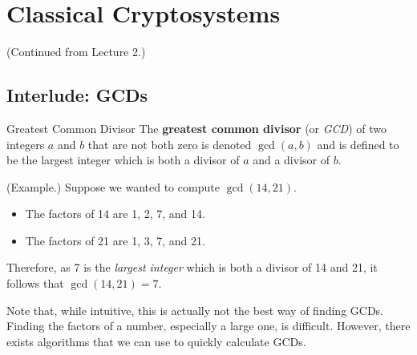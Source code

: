 \documentclass[letterpaper]{article}
\begin{document}
\section{Classical Cryptosystems}
(Continued from Lecture 2.)
\subsection{Interlude: GCDs}
\begin{definition}{Greatest Common Divisor}{}
    The \textbf{greatest common divisor} (or \emph{GCD}) of two integers $a$ and $b$ that are not both zero is denoted $\gcd(a, b)$ and is defined to be the largest integer which is both a divisor of $a$ and a divisor of $b$.
\end{definition}

\begin{mdframed}
    (Example.) Suppose we wanted to compute $\gcd(14, 21)$. 
    \begin{itemize}
        \item The factors of 14 are 1, 2, 7, and 14.
        \item The factors of 21 are 1, 3, 7, and 21. 
    \end{itemize}
    Therefore, as 7 is the \emph{largest integer} which is both a divisor of 14 and 21, it follows that $\gcd(14, 21) = 7$.
\end{mdframed}
Note that, while intuitive, this is actually not the best way of finding GCDs. Finding the factors of a number, especially a large one, is difficult. However, there exists algorithms that we can use to quickly calculate GCDs.
\end{document}
